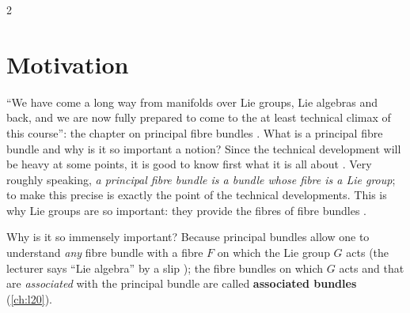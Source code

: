 \begin{paracol}{2}
\section{Motivation}\label{sec:pb-motivation}

``We have come a long way from manifolds over Lie groups, Lie algebras and back, and we are now fully prepared to come to the at least technical climax of this course'': the chapter on principal fibre bundles  . What is a principal fibre bundle and why is it so important a notion? Since the technical development will be heavy at some points, it is good to know first what it is all about . Very roughly speaking, \emph{a principal fibre bundle is a bundle whose fibre is a Lie group}; to make this precise is exactly the point of the technical developments. This is why Lie groups are so important: they provide the fibres of fibre bundles  .

Why is it so immensely important? Because principal bundles allow one to understand \emph{any} fibre bundle with a fibre $F$ on which the Lie group $G$ acts (the lecturer says ``Lie algebra'' by a slip ); the fibre bundles on which $G$ acts and that are \emph{associated} with the principal bundle are called \textbf{associated bundles}    (\cref{ch:l20}).


\end{paracol}
